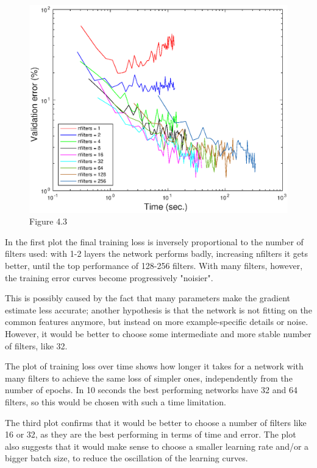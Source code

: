 \documentclass{article}
\begin{document}
    \begin{figure}[!htb]
        \centering
        \includegraphics[width=\textwidth]{figures/sc4_val_err_time}
        \captionsetup{labelformat=empty}
        \caption{Figure 4.3}
    \end{figure}
    
    In the first plot the final training loss is inversely proportional to the number of filters used: with 1-2 layers the network performs badly,
    increasing nfilters it gets better, until the top performance of 128-256 filters. With many filters, however, the training error curves become
    progressively "noisier". 
    
    This is possibly caused by the fact that many parameters make the gradient estimate less accurate;
    another hypothesis is that the network is not fitting on the common features anymore, 
    but instead on more example-specific details or noise.
    However, it would be better to choose some intermediate and more stable number of filters, like 32.
    
    The plot of training loss over time shows how longer it takes for a network with many filters to achieve the same loss of simpler ones, 
    independently from the number of epochs. 
    In 10 seconds the best performing networks have 32 and 64 filters, so this would be chosen with such a time limitation.
    
    The third plot confirms that it would be better to choose a number of filters like 16 or 32, as they are the best performing in terms of time and error.
    The plot also suggests that it would make sense to choose a smaller learning rate and/or a bigger batch size, to reduce the oscillation of the learning curves.
    
\end{document}
